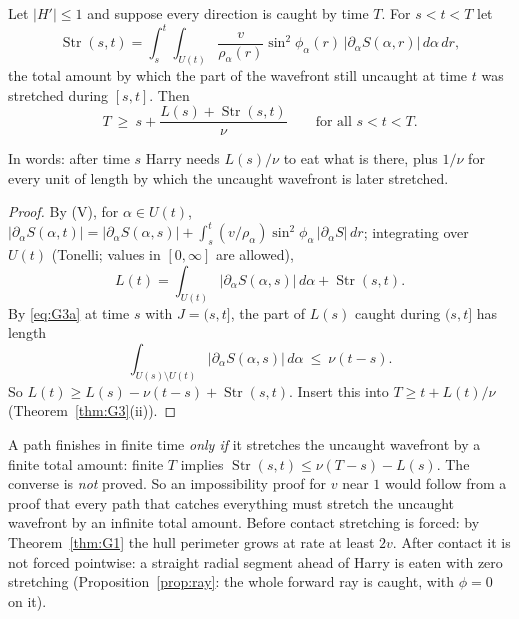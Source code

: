 \begin{proposition}\label{prop:G4}
Let $|H'|\le1$ and suppose every direction is caught by time $T$. For $s<t<T$ let
\[
\operatorname{Str}(s,t)=\int_s^t\int_{U(t)}\frac{v}{\rho_\alpha(r)}\sin^2\phi_\alpha(r)\,|\partial_\alpha S(\alpha,r)|\,d\alpha\,dr ,
\]
the total amount by which the part of the wavefront still uncaught at time $t$ was stretched during $[s,t]$. Then
\[
T\ \ge\ s+\frac{L(s)+\operatorname{Str}(s,t)}{\nu}\qquad\text{for all }s<t<T.
\]
\end{proposition}
In words: after time $s$ Harry needs $L(s)/\nu$ to eat what is there, plus $1/\nu$ for every unit of length by which the
uncaught wavefront is later stretched.
\begin{proof}
By (V), for $\alpha\in U(t)$, $|\partial_\alpha S(\alpha,t)|=|\partial_\alpha S(\alpha,s)|+\int_s^t(v/\rho_\alpha)\sin^2\phi_\alpha\,|\partial_\alpha S|\,dr$; integrating
over $U(t)$ (Tonelli; values in $[0,\infty]$ are allowed),
\[
L(t)=\int_{U(t)}|\partial_\alpha S(\alpha,s)|\,d\alpha+\operatorname{Str}(s,t).
\]
By \eqref{eq:G3a} at time $s$ with $J=(s,t]$, the part of $L(s)$ caught during $(s,t]$ has length
\[
\int_{U(s)\setminus U(t)}|\partial_\alpha S(\alpha,s)|\,d\alpha\ \le\ \nu(t-s).
\]
So $L(t)\ge L(s)-\nu(t-s)+\operatorname{Str}(s,t)$. Insert this
into $T\ge t+L(t)/\nu$ (Theorem~\ref{thm:G3}(ii)).
\end{proof}

\begin{remark}
A path finishes in finite time \emph{only if} it stretches the uncaught wavefront by a finite total amount: finite $T$ implies
$\operatorname{Str}(s,t)\le\nu(T-s)-L(s)$. The converse is \emph{not} proved. So an impossibility proof for $v$ near $1$ would follow from
a proof that every path that catches everything must stretch the uncaught wavefront by an infinite total amount. Before contact
stretching is forced: by Theorem~\ref{thm:G1} the hull perimeter grows at rate at least $2v$. After contact it is not forced
pointwise: a straight radial segment ahead of Harry is eaten with zero stretching (Proposition~\ref{prop:ray}: the whole forward
ray is caught, with $\phi=0$ on it).
\end{remark}

